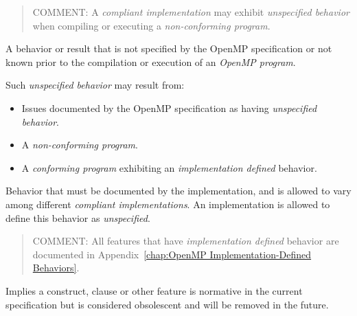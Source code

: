 \begin{quote}
COMMENT: A \emph{compliant implementation} may exhibit \emph{unspecified behavior} when 
compiling or executing a \emph{non-conforming program}.
\end{quote}
\glossarydefend

\glossarydefstart
A behavior or result that is not specified by the OpenMP specification or not 
known prior to the compilation or execution of an \emph{OpenMP program}.

Such \emph{unspecified behavior} may result from:

\begin{itemize}
\item Issues documented by the OpenMP specification as having \emph{unspecified 
behavior}.

\item A \emph{non-conforming program}.

\item A \emph{conforming program} exhibiting an \emph{implementation defined} behavior.
\end{itemize}
\glossarydefend

\glossarydefstart
Behavior that must be documented by the implementation, and is allowed to vary 
among different \emph{compliant implementations}. An implementation is allowed to 
define this behavior as \emph{unspecified}.

\begin{quote}
COMMENT: All features that have \emph{implementation defined} behavior 
are documented in Appendix~\ref{chap:OpenMP Implementation-Defined Behaviors}.
\end{quote}
\glossarydefend

\glossarydefstart
Implies a construct, clause or other feature is normative in the current specification but is considered obsolescent and will be removed in the future.
\glossarydefend









